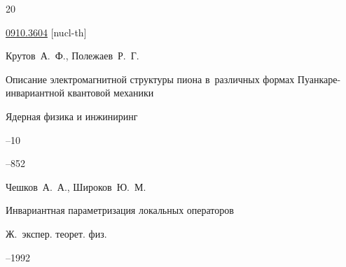 \begin{thebibliography}{20}



\arxiv \href{http://arxiv.org/abs/0910.3604}{0910.3604} [nucl-th]








\by Крутов~А.~Ф., Полежаев~Р.~Г.

\paper  Описание электромагнитной структуры пиона в~различных формах Пуанкаре-инвариантной квантовой механики

\jour Ядерная физика и инжиниринг



--10

--852






\by Чешков~А.~А.,  Широков~Ю.~М.

\paper   Инвариантная параметризация локальных операторов

\jour Ж.~экспер. теорет. физ.



--1992






%


%







\end{thebibliography}
